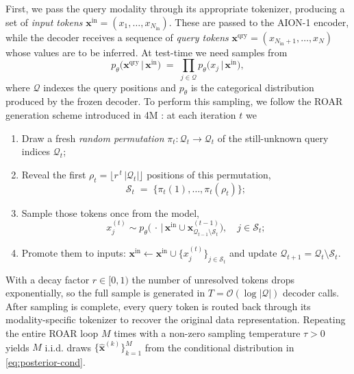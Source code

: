\documentclass[]{polymathic}
\begin{document}
First, we pass the query modality through its appropriate tokenizer, producing a set of \emph{input tokens} $\mathbf x^{\text{in}}\!=\!(x_1,\dots,x_{N_{\text{in}}})$. These are passed to the AION-1 encoder, while the decoder receives a sequence of \emph{query tokens}  $\mathbf x^{\text{qry}}\!=\!(x_{N_{\text{in}}+1},\dots,x_{N})$ whose values are to be inferred. At test-time we need samples from
\begin{equation}
   p_\theta\!\bigl(\mathbf x^{\text{qry}} \,\big|\, \mathbf x^{\text{in}}\bigr)
   \;=\;
   \prod_{j\in\mathcal Q}
   p_\theta\!\bigl(x_j \,\big|\, \mathbf x^{\text{in}}\bigr),
   \label{eq:posterior-cond}
\end{equation}
where $\mathcal Q$ indexes the query positions and $p_\theta$ is the categorical
distribution produced by the frozen decoder. To perform this sampling, we follow the ROAR generation scheme introduced in 4M \citep{mizrahi20234m}:
at each iteration $t$ we
\begin{enumerate}
  \item Draw a fresh \emph{random permutation}  
        $\pi_t : \mathcal Q_t \!\to\! \mathcal Q_t$ of the
        still-unknown query indices $\mathcal Q_t$;
  \item Reveal the first $\rho_t= \lfloor r^{\,t}\,|\mathcal Q_t|\rfloor$
        positions of this permutation,
        \[
          \mathcal S_t \;=\; \bigl\{ \pi_t(1),\dots,\pi_t(\rho_t) \bigr\};
        \]
  \item Sample those tokens once from the model,
        \[
          x_j^{(t)} \sim p_\theta\!\bigl(\,\cdot \,\big|\, \mathbf x^{\text{in}}\cup
          \mathbf x^{(t-1)}_{\mathcal Q_{t-1}\setminus\mathcal S_t}\bigr),
          \quad j\in\mathcal S_t;
        \]
  \item Promote them to inputs:
        $\mathbf x^{\text{in}}\!\leftarrow\!
        \mathbf x^{\text{in}}\cup \{x_j^{(t)}\}_{j\in\mathcal S_t}$ and
        update $\mathcal Q_{t+1} = \mathcal Q_t\setminus\mathcal S_t$.
\end{enumerate}
With a decay factor $r\!\in\![0,1)$ the number of unresolved tokens drops
exponentially, so the full sample is generated in $T=\mathcal O(\log|\mathcal Q|)$ decoder calls.  After sampling is complete, every query token is routed back through its modality-specific tokenizer to recover the original data representation. Repeating the entire ROAR loop $M$ times with a non-zero sampling
temperature $\tau>0$ yields $M$ i.i.d. draws $\{\hat{\mathbf x}^{(k)}\}_{k=1}^M$ from the conditional distribution in \autoref{eq:posterior-cond}.  
\end{document}
